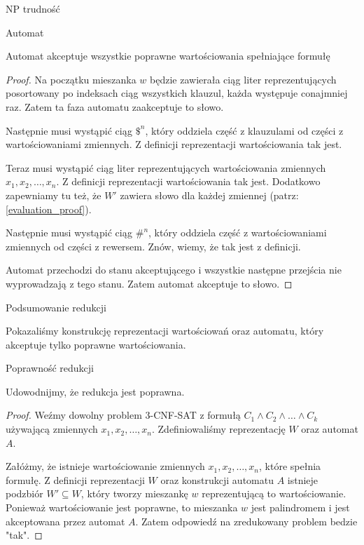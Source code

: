 \documentclass{article}
\theoremstyle{definition}
\theoremstyle{remark}
\begin{document}
\begin{section}{NP trudność}
\begin{subsection}{Automat}
\begin{subsection}{Automat akceptuje wszystkie poprawne wartościowania spełniające formułę}
\begin{proof}
             Na początku mieszanka $w$ będzie zawierała ciąg liter reprezentujących
             posortowany po indeksach ciąg wszystkich klauzul, każda występuje conajmniej
             raz. Zatem ta faza automatu zaakceptuje to słowo.

             Następnie musi wystąpić ciąg $ \$^n $, który oddziela część z klauzulami od
             części z wartościowaniami zmiennych. Z definicji reprezentacji wartościowania
             tak jest.

             Teraz musi wystąpić ciąg liter reprezentujących wartościowania zmiennych $x_1,
                 x_2, \ldots, x_n$. Z definicji reprezentacji wartościowania tak jest. Dodatkowo
             zapewniamy tu też, że $W'$ zawiera słowo dla każdej zmiennej (patrz:
             \ref{evaluation_proof}).

             Następnie musi wystąpić ciąg $ \#^n $, który oddziela część z wartościowaniami
             zmiennych od części z rewersem. Znów, wiemy, że tak jest z definicji.

             Automat przechodzi do stanu akceptującego i wszystkie następne przejścia nie
             wyprowadzają z tego stanu. Zatem automat akceptuje to słowo.

         \end{proof}
     \end{subsection}
 \end{subsection}

 \begin{subsection}{Podsumowanie redukcji}

     Pokazaliśmy konstrukcję reprezentacji wartościowań oraz automatu, który
     akceptuje tylko poprawne wartościowania.

 \end{subsection}

 \begin{subsection}{Poprawność redukcji}

     Udowodnijmy, że redukcja jest poprawna.

     \begin{proof}

         Weźmy dowolny problem 3-CNF-SAT z formułą $C_1 \land C_2 \land \ldots \land
             C_k$ używającą zmiennych $x_1, x_2, \ldots, x_n$. Zdefiniowaliśmy reprezentację
         $W$ oraz automat $A$.

         Załóżmy, że istnieje wartościowanie zmiennych $x_1, x_2, \ldots, x_n$, które
         spełnia formułę. Z definicji reprezentacji $W$ oraz konstrukcji automatu $A$
         istnieje podzbiór $W' \subseteq W$, który tworzy mieszankę $w$ reprezentującą
         to wartościowanie. Ponieważ wartościowanie jest poprawne, to mieszanka $w$ jest
         palindromem i jest akceptowana przez automat $A$. Zatem odpowiedź na
         zredukowany problem bedzie "tak".


\end{proof}
\end{subsection}
\end{section}
\end{document}
